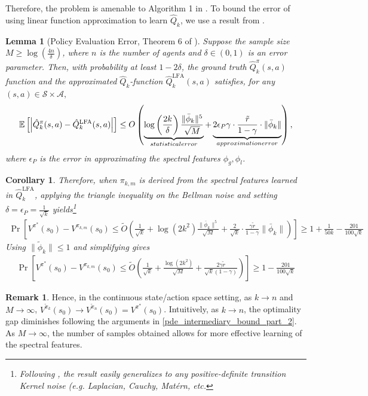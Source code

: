 \documentclass{article}
\theoremstyle{plain}
\newtheorem{lemma}[theorem]{Lemma}
\newtheorem{corollary}[theorem]{Corollary}
\theoremstyle{definition}
\newtheorem{remark}[theorem]{Remark}
\def\E{\mathbb{E}}
\begin{document}
Therefore, the problem is amenable to Algorithm 1 in \citet{ren2024scalablespectralrepresentationsnetwork}. To bound the error of using linear function approximation to learn $\hat{Q}_k$, we use a result from \citet{ren2024scalablespectralrepresentationsnetwork}.

\begin{lemma}[Policy Evaluation Error, Theorem 6 of \citet{ren2024scalablespectralrepresentationsnetwork}] Suppose the sample size $M\geq \log\left(\frac{4n}{\delta}\right)$, where $n$ is the number of agents and $\delta\in(0,1)$ is an error parameter. Then, with probability at least $1-2\delta$, the ground truth $\hat{Q}^\pi_k(s,a)$ function and the approximated $\hat{Q}_k$-function $\hat{Q}^{\mathrm{LFA}}_k(s,a)$ satisfies, for any $(s,a)\in \mathcal{S}\times\mathcal{A},$
    \[\E\left[\left|\hat{Q}_k^\pi(s,a) - \hat{Q}_k^{\mathrm{LFA}}(s,a)\right|\right] \leq O\left(\underbrace{\log\left(\frac{2k}{\delta}\right)\frac{ \|\bar{\phi}_k\|^5}{\sqrt{M}}}_{\emph{statistical error}} + \underbrace{2\epsilon_P\gamma\cdot\frac{\tilde{r}}{1-\gamma}\cdot\|\bar{\phi}_k\|}_{\emph{approximation error}}\right),\]
    \emph{where $\epsilon_P$ is the error in approximating the spectral features $\phi_g, \phi_l$.}\\
\end{lemma}

\begin{corollary} \emph{Therefore, when ${\pi}_{k,m}$ is derived from the spectral features learned in $\hat{Q}^{\mathrm{LFA}}_k$, applying the triangle inequality on the Bellman noise and setting $\delta=\epsilon_P=\frac{1}{\sqrt{k}}$ yields}\footnote{Following \cite{ren2024scalablespectralrepresentationsnetwork}, the result easily generalizes to any positive-definite transition Kernel noise (e.g. Laplacian, Cauchy, Matérn, etc.}
\begin{align*}
    \Pr\left[V^{\pi^*}(s_0)\!-\!V^{{\pi}_{k,m}}(s_0)\!\leq\!\tilde{O}\left(\frac{1}{\sqrt{k}}+\log\left(2k^2\right)\frac{\|\bar{\phi}_k\|^5}{\sqrt{M}}\!+\!\frac{2}{\sqrt{k}}\cdot\frac{\gamma \tilde{r}}{1-\gamma}\|\bar{\phi}_k\|\right)\right]\!\geq\!1\!+\!\frac{1}{50k}\!-\!\frac{201}{100\sqrt{k}}
\end{align*}
\emph{Using $\|\tilde{\phi}_k\|\leq 1$ and simplifying gives}
\begin{align*}
\Pr\left[V^{\pi^*}(s_0) - V^{{\pi}_{k,m}}(s_0) \leq \tilde{O}\left(\frac{1}{\sqrt{k}}+\frac{\log\left(2k^2\right)}{\sqrt{M}} + \frac{2\gamma \tilde{r}}{\sqrt{k}(1-\gamma)}\right)\right]\geq 1 - \frac{201}{100\sqrt{k}}
\end{align*}
\end{corollary}
\begin{remark}
    Hence, in the continuous state/action space setting, as $k\to n$ and $M\to\infty$, $V^{\tilde{\pi}_{k}}(s_0)\to V^{\tilde{\pi}_{n}}(s_0) =  V^{\pi^*}(s_0)$. Intuitively, as $k\to n$, the optimality gap diminishes following the arguments in \cref{pde_intermediary_bound_part_2}. As $M\to\infty$, the number of samples obtained  allows for more effective learning of the spectral features.\\
\end{remark}
\end{document}
